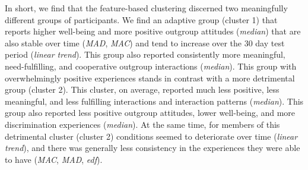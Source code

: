 In short, we find that the feature-based clustering discerned two
meaningfully different groups of participants. We find an adaptive group
(cluster 1) that reports higher well-being and more positive outgroup
attitudes (\textit{median}) that are also stable over time
(\textit{MAD}, \textit{MAC}) and tend to increase over the 30 day test
period (\textit{linear trend}). This group also reported consistently
more meaningful, need-fulfilling, and cooperative outgroup interactions
(\textit{median}). This group with overwhelmingly positive experiences
stands in contrast with a more detrimental group (cluster 2). This
cluster, on average, reported much less positive, less meaningful, and
less fulfilling interactions and interaction patterns (\textit{median}).
This group also reported less positive outgroup attitudes, lower
well-being, and more discrimination experiences (\textit{median}). At
the same time, for members of this detrimental cluster (cluster 2)
conditions seemed to deteriorate over time (\textit{linear trend}), and
there was generally less consistency in the experiences they were able
to have (\textit{MAC}, \textit{MAD}, \textit{edf}).

